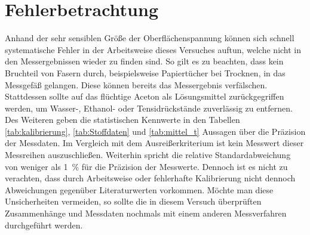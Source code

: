 \newpage
\section{Fehlerbetrachtung}
\label{sec:fehler}

Anhand der sehr sensiblen Größe der Oberflächenspannung können sich schnell systematische Fehler in der Arbeitsweise dieses Versuches auftun, welche nicht in den Messergebnissen wieder zu finden sind. So gilt es zu beachten, dass kein Bruchteil von Fasern durch, beispielsweise Papiertücher bei Trocknen, in das Messgefäß gelangen. Diese können bereits das Messergebnis verfälschen. Stattdessen sollte auf das flüchtige Aceton als Lösungsmittel zurückgegriffen werden, um Wasser-, Ethanol- oder Tensidrückstände zuverlässig zu entfernen.\\
Des Weiteren geben die statistischen Kennwerte in den Tabellen \ref{tab:kalibrierung}, \ref{tab:Stoffdaten} und \ref{tab:mittel_t} Aussagen über die Präzision der Messdaten. Im Vergleich mit dem Ausreißerkriterium ist kein Messwert dieser Messreihen auszuschließen. Weiterhin spricht die relative Standardabweichung von weniger als \SI{1}{\percent} für die Präzision der Messwerte.\linebreak
Dennoch ist es nicht zu verachten, dass durch Arbeitsweise oder fehlerhafte Kalibrierung nicht dennoch Abweichungen gegenüber Literaturwerten vorkommen. Möchte man diese Unsicherheiten vermeiden, so sollte die in diesem Versuch überprüften Zusammenhänge und Messdaten nochmals mit einem anderen Messverfahren durchgeführt werden.